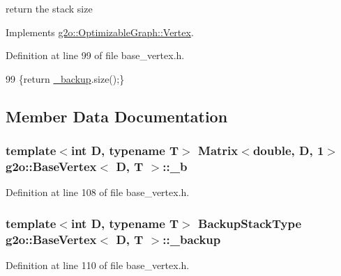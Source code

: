 return the stack size 



Implements \hyperlink{classg2o_1_1OptimizableGraph_1_1Vertex_a0a4ecc894d008d9c3806a3660e7dfe6f}{g2o\+::\+Optimizable\+Graph\+::\+Vertex}.



Definition at line 99 of file base\+\_\+vertex.\+h.


\begin{DoxyCode}
99 \{\textcolor{keywordflow}{return} \hyperlink{classg2o_1_1BaseVertex_a936082916993857a77c8318bc3e59d23}{\_backup}.size();\}
\end{DoxyCode}


\subsection{Member Data Documentation}
\subsubsection[{\texorpdfstring{\+\_\+b}{_b}}]{\setlength{\rightskip}{0pt plus 5cm}template$<$int D, typename T$>$ Matrix$<$double, D, 1$>$ {\bf g2o\+::\+Base\+Vertex}$<$ D, T $>$\+::\+\_\+b\hspace{0.3cm}{\ttfamily [protected]}}\hypertarget{classg2o_1_1BaseVertex_a70c672f2997275927efa49c1f5b18ac3}{}\label{classg2o_1_1BaseVertex_a70c672f2997275927efa49c1f5b18ac3}


Definition at line 108 of file base\+\_\+vertex.\+h.

\subsubsection[{\texorpdfstring{\+\_\+backup}{_backup}}]{\setlength{\rightskip}{0pt plus 5cm}template$<$int D, typename T$>$ {\bf Backup\+Stack\+Type} {\bf g2o\+::\+Base\+Vertex}$<$ D, T $>$\+::\+\_\+backup\hspace{0.3cm}{\ttfamily [protected]}}\hypertarget{classg2o_1_1BaseVertex_a936082916993857a77c8318bc3e59d23}{}\label{classg2o_1_1BaseVertex_a936082916993857a77c8318bc3e59d23}


Definition at line 110 of file base\+\_\+vertex.\+h.

